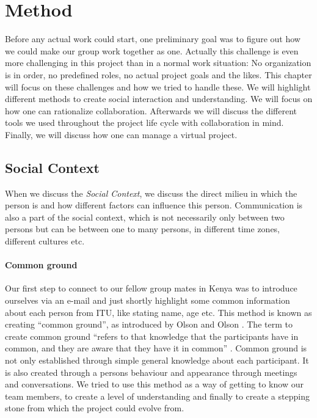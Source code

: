 \section{Method} \label{sec:method}
Before any actual work could start, one preliminary goal was to figure out how we could make our group work together as one. Actually this challenge is even more challenging in this project than in a normal work situation: No organization is in order, no predefined roles, no actual project goals and the likes. This chapter will focus on these challenges and how we tried to handle these. We will highlight different methods to create social interaction and understanding. We will focus on how one can rationalize collaboration. Afterwards we will discuss the different tools we used throughout the project life cycle with collaboration in mind. Finally, we will discuss how one can manage a virtual project.\\

\subsection{Social Context} \label{subsec:socialcontext}
When we discuss the \textit{Social Context}, we discuss the direct milieu in which the person is and how different factors can influence this person. Communication is also a part of the social context, which is not necessarily only between two persons but can be between one to many persons, in different time zones, different cultures etc.\\
\paragraph{Common ground} \label{par:commonground}
Our first step to connect to our fellow group mates in Kenya was to introduce ourselves via an e-mail and just shortly highlight some common information about each person from ITU, like stating name, age etc. This method is known as creating ``common ground'', as introduced by Olson and Olson \cite{olson:2000:distance}. The term to create common ground ``refers to that knowledge that the participants have in common, and they are aware that they have it in common'' \cite{olson:2000:distance}. Common ground is not only established through simple general knowledge about each participant. It is also created through a persons behaviour and appearance through meetings and conversations. We tried to use this method as a way of getting to know our team members, to create a level of understanding and finally to create a stepping stone from which the project could evolve from.

